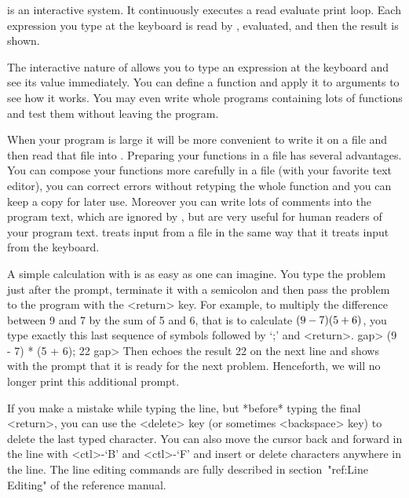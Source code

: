\null

%
{\GAP}  is  an   interactive   system.    It  continuously   executes   a
read evaluate print loop.  Each  expression you type  at the  keyboard is
read by {\GAP}, evaluated, and then the result is shown.

The interactive nature of {\GAP} allows you to type  an expression at the
keyboard and see its value immediately.  You can  define a  function  and
apply it to arguments  to  see how  it  works.  You may  even write whole
programs containing lots  of functions and test them without leaving  the
program.

When  your program is large it  will be more  convenient to write it on a
file and then read that file  into {\GAP}. Preparing  your functions in a
file   has  several advantages.  You  can   compose  your functions  more
carefully in a  file (with your favorite  text  editor), you can  correct
errors without retyping  the whole function and you  can keep a  copy for
later use. Moreover you can write lots of comments into the program text,
which are ignored  by {\GAP}, but are   very useful for  human readers of
your program text. {\GAP} treats  input from a  file in the same way that
it treats input from the keyboard.

A simple calculation with {\GAP} is as easy as one can imagine.  You type
the problem just after the prompt, terminate it with a semicolon and then
pass the problem to the  program with the <return> key.  For  example, to
multiply the difference between 9 and 7 by the sum of 5 and 6, that is to
calculate  $(9 - 7) \* (5 + 6)$, you type exactly this  last sequence  of
symbols followed by `;' and <return>.
\beginexample
gap> (9 - 7) * (5 + 6);
22
gap> 
\endexample
Then {\GAP} echoes   the result 22 on the   next line and shows with  the
prompt  that it is ready  for the  next problem.  Henceforth,  we will no
longer print this additional prompt.

%
If you make a mistake while typing the line,
but *before* typing the final <return>,
you can use the <delete> key (or sometimes <backspace> key)
to delete the last typed character.
You can also move the cursor back and forward in the line with <ctl>-`B'
and <ctl>-`F' and insert or delete characters anywhere in the line.
The line editing commands are fully described
in section~"ref:Line Editing" of the reference manual.

